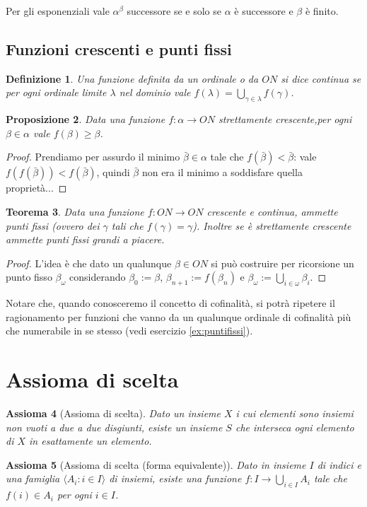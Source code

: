 \documentclass[a4paper,10pt,oneside]{article}
\newcommand{\myname}[1]{\emph{#1}}
\theoremstyle{plain}
\newtheorem{mytheorem}{Teorema}[section]
\newtheorem{mydef}[mytheorem]{Definizione}
\newtheorem{myprop}[mytheorem]{Proposizione}
\newtheorem{myax}[mytheorem]{Assioma}
\theoremstyle{definition}
\theoremstyle{remark}
\begin{document}
Per gli esponenziali vale $\alpha^\beta$ successore se e solo se $\alpha$ è successore e $\beta$ è finito.

\subsection{Funzioni crescenti e punti fissi}

\begin{mydef}
 Una funzione definita da un ordinale o da $ON$ si dice \myname{continua} se per ogni ordinale limite $\lambda$ nel dominio vale $f(\lambda)=\bigcup_{\gamma\in\lambda}f(\gamma)$.
\end{mydef}

\begin{myprop}
 Data una funzione $f:\alpha \rightarrow ON$ strettamente crescente,per ogni $\beta\in\alpha$ vale $f(\beta)\ge\beta$.
\end{myprop}
\begin{proof}
 Prendiamo per assurdo il minimo $\bar\beta\in\alpha$ tale che $f(\bar\beta)<\bar\beta$: vale $f(f(\bar\beta))<f(\bar\beta)$, quindi $\bar\beta$ non era il minimo a soddisfare quella proprietà...
\end{proof}

\begin{mytheorem}
 Data una funzione $f:ON \rightarrow ON$ crescente e continua, ammette punti fissi (ovvero dei $\gamma$ tali che $f(\gamma)=\gamma$). Inoltre se è strettamente crescente ammette punti fissi grandi a piacere.
\end{mytheorem}
\begin{proof}
 L'idea è che dato un qualunque $\beta\in ON$ si può costruire per ricorsione un punto fisso $\beta_\omega$ considerando $\beta_0:=\beta$, $\beta_{n+1}:=f(\beta_n)$ e $\beta_\omega:=\bigcup_{i\in\omega}\beta_i$.
\end{proof}

Notare che, quando conosceremo il concetto di cofinalità, si potrà ripetere il ragionamento per funzioni che vanno da un qualunque ordinale di cofinalità più che numerabile in se stesso (vedi esercizio \ref{ex:puntifissi}).


\section{Assioma di scelta}

\begin{myax}[Assioma di scelta]
 Dato un insieme $X$ i cui elementi sono insiemi non vuoti a due a due disgiunti, esiste un insieme $S$ che interseca ogni elemento di $X$ in esattamente un elemento.
\end{myax}
\begin{myax}[Assioma di scelta (forma equivalente)]
 Dato in insieme $I$ di indici e una famiglia $\langle A_i : i \in I\rangle$ di insiemi, esiste una funzione $f:I \rightarrow \bigcup_{i\in I}A_i$ tale che $f(i)\in A_i$ per ogni $i\in I$.
\end{myax}
\end{document}
